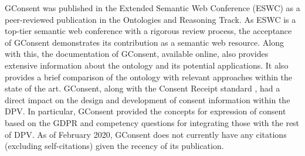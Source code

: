 GConsent was published in the Extended Semantic Web Conference (ESWC) as a peer-reviewed publication \cite{pandit_gconsent_2019} in the Ontologies and Reasoning Track. As ESWC is a top-tier semantic web conference with a rigorous review process, the acceptance of GConsent demonstrates its contribution as a semantic web resource.
Along with this, the documentation of GConsent, available online, also provides extensive information about the ontology and its potential applications. It also provides a brief comparison of the ontology with relevant approaches within the state of the art.
GConsent, along with the Consent Receipt standard \cite{lizar_consent_2017}, had a direct impact on the design and development of consent information within the DPV. In particular, GConsent provided the concepts for expression of consent based on the GDPR and competency questions for integrating those with the rest of DPV.
As of February 2020, GConsent does not currently have any citations (excluding self-citations) given the recency of its publication.

